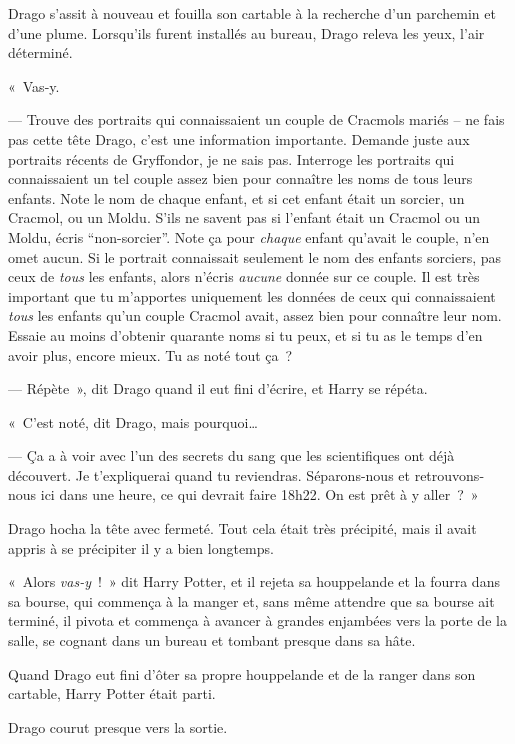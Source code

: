 Drago s'assit à nouveau et fouilla son cartable à la recherche d'un parchemin et d'une plume. Lorsqu'ils furent installés au bureau, Drago releva les yeux, l'air déterminé.

«~Vas-y.

--- Trouve des portraits qui connaissaient un couple de Cracmols mariés -- ne fais pas cette tête Drago, c'est une information importante. Demande juste aux portraits récents de Gryffondor, je ne sais pas. Interroge les portraits qui connaissaient un tel couple assez bien pour connaître les noms de tous leurs enfants. Note le nom de chaque enfant, et si cet enfant était un sorcier, un Cracmol, ou un Moldu. S'ils ne savent pas si l'enfant était un Cracmol ou un Moldu, écris “non-sorcier”. Note ça pour \emph{chaque} enfant qu'avait le couple, n'en omet aucun. Si le portrait connaissait seulement le nom des enfants sorciers, pas ceux de \emph{tous} les enfants, alors n'écris \emph{aucune} donnée sur ce couple. Il est très important que tu m'apportes uniquement les données de ceux qui connaissaient \emph{tous} les enfants qu'un couple Cracmol avait, assez bien pour connaître leur nom. Essaie au moins d'obtenir quarante noms si tu peux, et si tu as le temps d'en avoir plus, encore mieux. Tu as noté tout ça~?

--- Répète~», dit Drago quand il eut fini d'écrire, et Harry se répéta.

«~C'est noté, dit Drago, mais pourquoi…

--- Ça a à voir avec l'un des secrets du sang que les scientifiques ont déjà découvert. Je t'expliquerai quand tu reviendras. Séparons-nous et retrouvons-nous ici dans une heure, ce qui devrait faire 18h22. On est prêt à y aller~?~»

Drago hocha la tête avec fermeté. Tout cela était très précipité, mais il avait appris à se précipiter il y a bien longtemps.

«~Alors \emph{vas-y}~!~» dit Harry Potter, et il rejeta sa houppelande et la fourra dans sa bourse, qui commença à la manger et, sans même attendre que sa bourse ait terminé, il pivota et commença à avancer à grandes enjambées vers la porte de la salle, se cognant dans un bureau et tombant presque dans sa hâte.

Quand Drago eut fini d'ôter sa propre houppelande et de la ranger dans son cartable, Harry Potter était parti.

Drago courut presque vers la sortie.~
